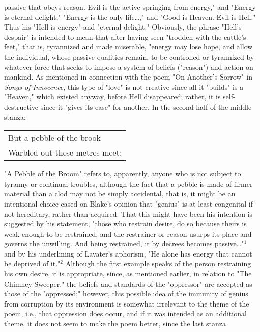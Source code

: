 \noindent passive that obeys reason. Evil is
the active springing from energy," and "Energy is eternal delight," "Energy is the only life\dots," and "Good is Heaven. Evil is Hell."
Thus his "Hell is energy" and "eternal delight." Obviously, the phrase "Hell's despair" is intended to mean
that after having seen "trodden with the cattle's feet," that is, tyrannized and made miserable, "energy may lose hope, and allow
the individual, whose passive qualities remain, to be controlled or tyrannized by whatever force
that seeks to impose a system of beliefs ("reason") and action on mankind. As mentioned in connection
with the poem "On Another's Sorrow" in \textit{Songs of Innocence}, this type of "love" is not creative since
all it "builds" is a "Heaven," which existed anyway, before Hell disappeared; rather, it is self-destructive
since it "gives its ease" for another. In the second half of the middle stanza:\par
\begin{center}
	\begin{tabular}{l}
		But a pebble of the brook \\
		Warbled out these metres meet:
	\end{tabular}
\end{center}
\hspace*{5mm}"A Pebble of the Broom" refers to, apparently, anyone who is not subject to tyranny or continual troubles,
although the fact that a pebble is made of firmer material than a clod may not be simply accidental, that is, it
might be an intentional choice eased on Blake's opinion that "genius" is at least congenital if not
hereditary, rather than acquired. That this might have been his intention is suggested by his statement, "those who
restrain desire, do so because theirs is weak enough to be restrained, and the restrainer or reason usurps
its place and governs the unwilling. And being restrained, it by decrees becomes passive\dots"$^{1}$ and by his underlining
of Lavater's aphorism, "He alone has energy that cannot be deprived of it."$^{2}$ Although the first example speaks
of the person restraining his own desire, it is appropriate, since, as mentioned earlier, in relation to "The Chimney Sweeper,"
the beliefs and standards of the "oppressor" are accepted as those of the "oppressed;" however, this possible idea of the immunity
of genius from corruption by its environment is somewhat irrelevant to the theme of the poem, i.e., that oppression does occur,
and if it was intended as an additional theme, it does not seem to make the poem better, since the last stanza
